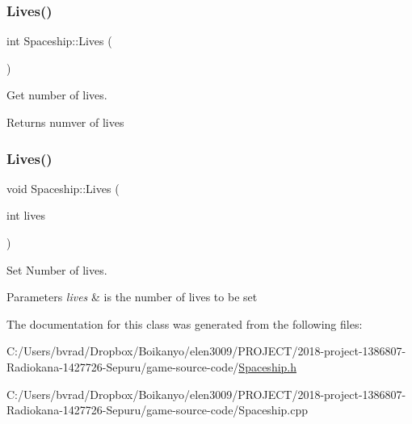 \subsubsection{\texorpdfstring{Lives()}{Lives()}\hspace{0.1cm}{\footnotesize\ttfamily [1/2]}}
{\footnotesize\ttfamily int Spaceship\+::\+Lives (\begin{DoxyParamCaption}{ }\end{DoxyParamCaption})\hspace{0.3cm}{\ttfamily [inline]}}



Get number of lives. 

\begin{DoxyReturn}{Returns}
numver of lives 
\end{DoxyReturn}
\mbox{\label{class_spaceship_a02a31fd44b5b9f60743d1e04f10fa113}} 
\subsubsection{\texorpdfstring{Lives()}{Lives()}\hspace{0.1cm}{\footnotesize\ttfamily [2/2]}}
{\footnotesize\ttfamily void Spaceship\+::\+Lives (\begin{DoxyParamCaption}\item[{int}]{lives }\end{DoxyParamCaption})\hspace{0.3cm}{\ttfamily [inline]}}



Set Number of lives. 


\begin{DoxyParams}{Parameters}
{\em lives} & is the number of lives to be set \\
\hline
\end{DoxyParams}


The documentation for this class was generated from the following files\+:\begin{DoxyCompactItemize}
\item 
C\+:/\+Users/bvrad/\+Dropbox/\+Boikanyo/elen3009/\+P\+R\+O\+J\+E\+C\+T/2018-\/project-\/1386807-\/\+Radiokana-\/1427726-\/\+Sepuru/game-\/source-\/code/\mbox{\hyperlink{_spaceship_8h}{Spaceship.\+h}}\item 
C\+:/\+Users/bvrad/\+Dropbox/\+Boikanyo/elen3009/\+P\+R\+O\+J\+E\+C\+T/2018-\/project-\/1386807-\/\+Radiokana-\/1427726-\/\+Sepuru/game-\/source-\/code/Spaceship.\+cpp\end{DoxyCompactItemize}
